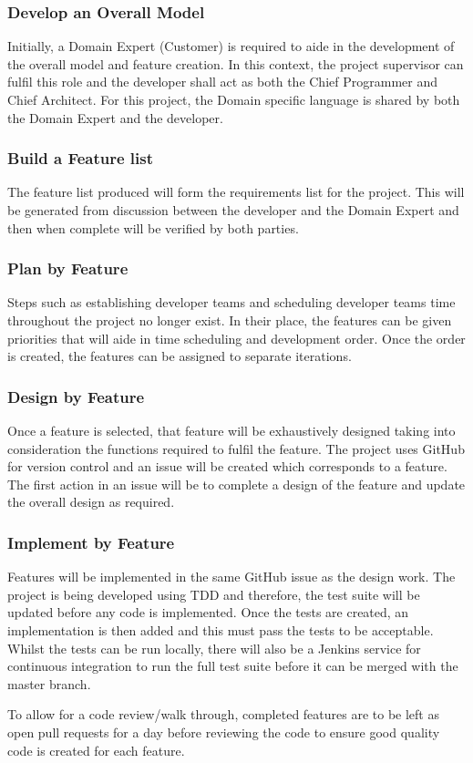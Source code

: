 \subsubsection{Develop an Overall Model}
Initially, a Domain Expert (Customer) is required to aide in the development of the overall model and feature creation. In this context, the project supervisor can fulfil this role and the developer shall act as both the Chief Programmer and Chief Architect. For this project, the Domain specific language is shared by both the Domain Expert and the developer.

\subsubsection{Build a Feature list}
The feature list produced will form the requirements list for the project. This will be generated from discussion between the developer and the Domain Expert and then when complete will be verified by both parties.

\subsubsection{Plan by Feature}
Steps such as establishing developer teams and scheduling developer teams time throughout the project no longer exist. In their place, the features can be given priorities that will aide in time scheduling and development order. Once the order is created, the features can be assigned to separate iterations.

\subsubsection{Design by Feature}
Once a feature is selected, that feature will be exhaustively designed taking into consideration the functions required to fulfil the feature. The project uses GitHub for version control and an issue will be created which corresponds to a feature. The first action in an issue will be to complete a design of the feature and update the overall design as required.

\subsubsection{Implement by Feature}
Features will be implemented in the same GitHub issue as the design work. The project is being developed using TDD and therefore, the test suite will be updated before any code is implemented. Once the tests are created, an implementation is then added and this must pass the tests to be acceptable. Whilst the tests can be run locally, there will also be a Jenkins service for continuous integration to run the full test suite before it can be merged with the master branch.  

To allow for a code review/walk through, completed features are to be left as open pull requests for a day before reviewing the code to ensure good quality code is created for each feature.